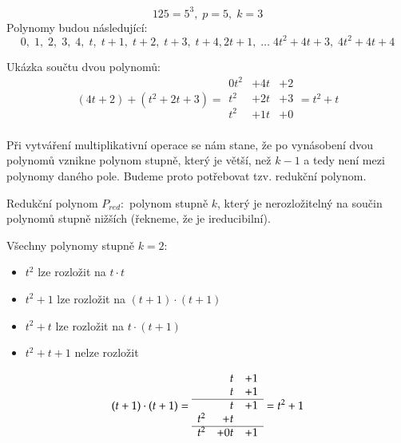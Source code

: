 \begin{example}
    $$125 = 5^3, \; p = 5, \; k = 3$$
    Polynomy budou následující:
    $$0, \; 1, \; 2, \; 3, \; 4, \; t, \; t + 1, \; t + 2, \; t + 3, \; t + 4,
        2t + 1,\; \dots \;4t^2 + 4t + 3, \;  4t^2 + 4t + 4$$

Ukázka součtu dvou polynomů:
\[
    (4t + 2) + (t^2 + 2t + 3)
    =
    \begin{array}{rrr}
        0t^2 & + 4t & + 2\\
        t^2  & + 2t & + 3\\ \hline
        t^2  & + 1t & + 0\\
          &
    \end{array}
= t^2 + t
\]
\end{example}

Při vytváření multiplikativní operace se nám stane, že po vynásobení dvou polynomů
vznikne polynom stupně, který je větší, než $k - 1$ a tedy není mezi polynomy daného pole.
Budeme proto potřebovat tzv. redukční polynom.
\begin{definition}
    Redukční polynom $P_{red}:$ polynom stupně $k$, který je nerozložitelný na součin
    polynomů stupně nižších (řekneme, že je ireducibilní).
\end{definition}


\begin{example}

Všechny polynomy stupně $k=2$:
    \begin{itemize}
        \item $t^2$ lze rozložit na $t \cdot t$
        \item $t^2 + 1$ lze rozložit na $(t + 1) \cdot (t + 1)$
        \item $t^2 + t$ lze rozložit na $t \cdot (t + 1)$
        \item $t^2 + t + 1$ nelze rozložit
    \end{itemize}

\[
    (t + 1) \cdot (t + 1) =
    \begin{array}{rrr}
        &t&+1 \\
        &t&+1 \\ \hline
        &t&+1 \\
        t^2&+t& \\ \hline
        t^2&+0t&+1
    \end{array}
= t^2 + 1
\]
\end{example}

